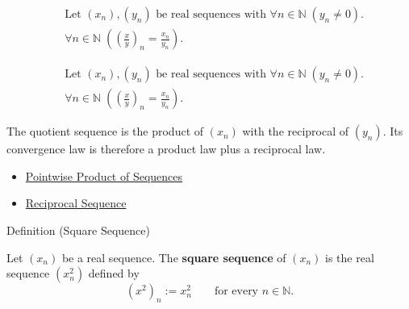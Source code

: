 \begin{remark*}
\[
\begin{aligned}
&\text{Let } (x_n),(y_n) \text{ be real sequences with }
  \forall n\in\mathbb{N}\;(y_n\neq 0).\\
&\forall n\in\mathbb{N}\;
\left(\left(\frac{x}{y}\right)_n=\frac{x_n}{y_n}\right).
\end{aligned}
\]
\end{remark*}

\begin{remark*}
\[
\begin{aligned}
&\text{Let } (x_n),(y_n) \text{ be real sequences with }
  \forall n\in\mathbb{N}\;(y_n\neq 0).\\
&\forall n\in\mathbb{N}\;
\left(\left(\frac{x}{y}\right)_n=\frac{x_n}{y_n}\right).
\end{aligned}
\]
\end{remark*}

\begin{remark*}[Interpretation]
The quotient sequence is the product of $(x_n)$ with the reciprocal of
$(y_n)$. Its convergence law is therefore a product law plus a reciprocal law.
\end{remark*}

\begin{dependencies}
\begin{itemize}
  \item \hyperref[def:pointwise-product-sequence]{Pointwise Product of Sequences}
  \item \hyperref[def:reciprocal-sequence]{Reciprocal Sequence}
\end{itemize}
\end{dependencies}


\begin{definitionbox}{Definition (Square Sequence)}
\begin{definition}
\label{def:square-sequence}
Let $(x_n)$ be a real sequence. The \textbf{square sequence} of $(x_n)$ is
the real sequence $(x_n^2)$ defined by
\[
(x^2)_n := x_n^2
\qquad
\text{for every } n\in\mathbb{N}.
\]
\end{definition}
\end{definitionbox}

